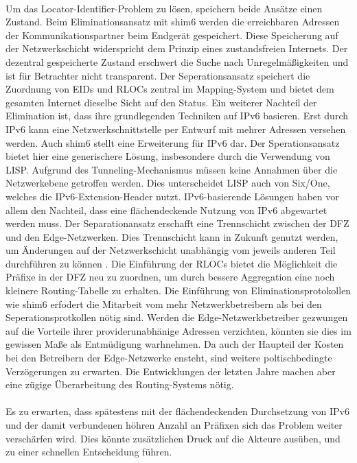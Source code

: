 \paragraph{}
Um das Locator-Identifier-Problem zu lösen, speichern beide Ansätze ei\-nen Zustand. Beim Eliminationsansatz mit shim6 werden die erreichbaren Adressen der Kommunikationspartner beim Endgerät gespeichert. Diese Speicherung auf der Netzwerkschicht widerspricht dem Prinzip eines zustandsfreien Internets. Der dezentral gespeicherte Zustand erschwert die Suche nach Unregelmäßigkeiten und ist für Betrachter nicht transparent. Der Seperationsansatz speichert die Zuordnung von EIDs und RLOCs zentral im Mapping-System und bietet dem gesamten Internet dieselbe Sicht auf den Status.
Ein weiterer Nachteil der Elimination ist, dass ihre grundlegenden Techniken auf IPv6 basieren. Erst durch IPv6 kann eine Netzwerkschnittstelle per Entwurf mit mehrer Adressen versehen werden. Auch shim6 stellt eine Erweiterung für IPv6 dar. Der Sperationsansatz bietet hier eine generischere Lösung, insbesondere durch die Verwendung von LISP. Aufgrund des Tunneling-Mechanismus müssen keine Annahmen über die Netzwerkebene getroffen werden. Dies unterscheidet LISP auch von Six/One, welches die IPv6-Extension-Header nutzt. IPv6-basierende Lösungen haben vor allem den Nachteil, dass eine flächendeckende Nutzung von IPv6 abgewartet werden muss. 
Der Separationansatz erschafft eine Trennschicht zwischen der DFZ und den Edge-Netzwerken. Dies Trennschicht kann in Zukunft genutzt werden, um Änderungen auf der Netzwerkschicht unabhängig vom jeweils anderen Teil durchführen zu können \cite{jen:2008:start}.
Die Einführung der RLOCs bietet die Möglichkeit die Präfixe in der DFZ neu zu zuordnen, um durch bessere Aggregation eine noch kleinere Routing-Tabelle zu erhalten. 
Die Einführung von Eliminationsprotokollen wie shim6 erfodert die Mitarbeit vom mehr Netzwerkbetreibern als bei den Seperationsprotkollen nötig sind. Werden die Edge-Netzwerkbetreiber gezwungen auf die Vorteile ihrer providerunabhänige Adressen verzichten, könnten sie dies im gewissen Maße als Entmüdigung warhnehmen. Da auch der Haupteil der Kosten bei den Betreibern der Edge-Netzwerke ensteht, sind weitere poltischbedingte Verzögerungen zu erwarten. Die Entwicklungen der letzten Jahre machen aber eine zügige Überarbeitung des Routing-Systems nötig.

\paragraph{}
Es zu erwarten, dass spätestens mit der flächendeckenden Durchsetzung von IPv6 und der damit verbundenen höhren Anzahl an Präfixen sich das Problem weiter verschärfen wird. Dies könnte zusätzlichen Druck auf die Akteure ausüben, und zu einer schnellen Entscheidung führen.
